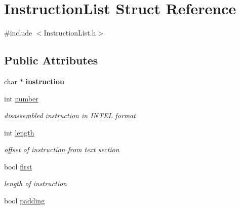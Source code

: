\hypertarget{structInstructionList}{
\section{InstructionList Struct Reference}
\label{structInstructionList}
}


{\ttfamily \#include $<$InstructionList.h$>$}

\subsection*{Public Attributes}
\begin{DoxyCompactItemize}
\item 
\hypertarget{structInstructionList_ac74eea2eaf0809df3b92cf67fe3862ff}{
char $\ast$ {\bfseries instruction}}
\label{structInstructionList_ac74eea2eaf0809df3b92cf67fe3862ff}

\item 
\hypertarget{structInstructionList_af3462c74f4e95d480be0646b2f605741}{
int \hyperlink{structInstructionList_af3462c74f4e95d480be0646b2f605741}{number}}
\label{structInstructionList_af3462c74f4e95d480be0646b2f605741}

\begin{DoxyCompactList}\small\item\em disassembled instruction in INTEL format \item\end{DoxyCompactList}\item 
\hypertarget{structInstructionList_a7bff02db771b53bfef851bf87a7f9c99}{
int \hyperlink{structInstructionList_a7bff02db771b53bfef851bf87a7f9c99}{length}}
\label{structInstructionList_a7bff02db771b53bfef851bf87a7f9c99}

\begin{DoxyCompactList}\small\item\em offset of instruction from text section \item\end{DoxyCompactList}\item 
\hypertarget{structInstructionList_a44050405954e74cdc3a0ee749046fc0f}{
bool \hyperlink{structInstructionList_a44050405954e74cdc3a0ee749046fc0f}{first}}
\label{structInstructionList_a44050405954e74cdc3a0ee749046fc0f}

\begin{DoxyCompactList}\small\item\em length of instruction \item\end{DoxyCompactList}\item 
\hypertarget{structInstructionList_a6ca0299eca2cd0e7770f17ee1c7e7c91}{
bool \hyperlink{structInstructionList_a6ca0299eca2cd0e7770f17ee1c7e7c91}{padding}}
\label{structInstructionList_a6ca0299eca2cd0e7770f17ee1c7e7c91}


\end{DoxyCompactItemize}
